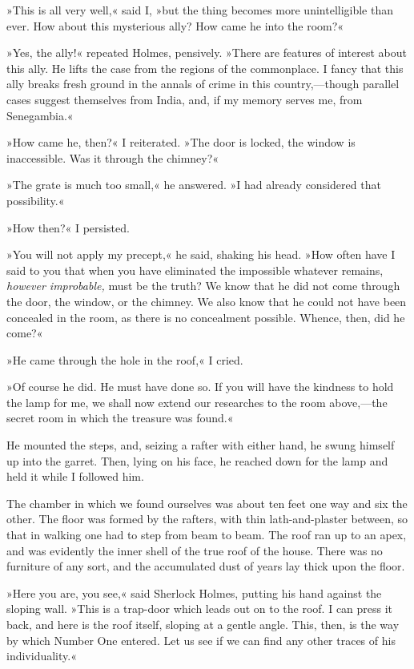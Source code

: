 »This is all very well,« said I, »but the thing becomes more unintelligible than ever. How about this mysterious ally? How came he into the room?«

»Yes, the ally!« repeated Holmes, pensively. »There are features of interest about this ally. He lifts the case from the regions of the commonplace. I fancy that this ally breaks fresh ground in the annals of crime in this country,—though parallel cases suggest themselves from India, and, if my memory serves me, from Senegambia.«

»How came he, then?« I reiterated. »The door is locked, the window is inaccessible. Was it through the chimney?«

»The grate is much too small,« he answered. »I had already considered that possibility.«

»How then?« I persisted.

»You will not apply my precept,« he said, shaking his head. »How often have I said to you that when you have eliminated the impossible whatever remains, \textit{however improbable,} must be the truth? We know that he did not come through the door, the window, or the chimney. We also know that he could not have been concealed in the room, as there is no concealment possible. Whence, then, did he come?«

»He came through the hole in the roof,« I cried.

»Of course he did. He must have done so. If you will have the kindness to hold the lamp for me, we shall now extend our researches to the room above,—the secret room in which the treasure was found.«

He mounted the steps, and, seizing a rafter with either hand, he swung himself up into the garret. Then, lying on his face, he reached down for the lamp and held it while I followed him.

The chamber in which we found ourselves was about ten feet one way and six the other. The floor was formed by the rafters, with thin lath-and-plaster between, so that in walking one had to step from beam to beam. The roof ran up to an apex, and was evidently the inner shell of the true roof of the house. There was no furniture of any sort, and the accumulated dust of years lay thick upon the floor.

»Here you are, you see,« said Sherlock Holmes, putting his hand against the sloping wall. »This is a trap-door which leads out on to the roof. I can press it back, and here is the roof itself, sloping at a gentle angle. This, then, is the way by which Number One entered. Let us see if we can find any other traces of his individuality.«

